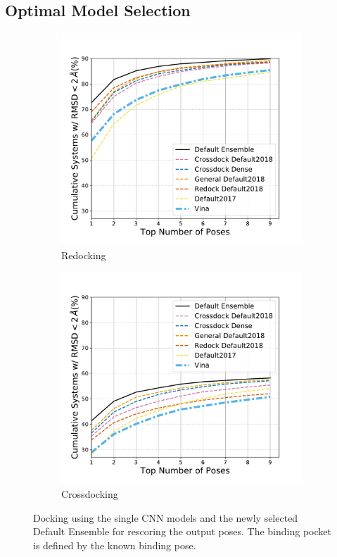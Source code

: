 \documentclass[journal=jcisd8,manuscript=article]{achemso}
\begin{document}
\subsection{Optimal Model Selection}
\begin{figure}
	\begin{subfigure}[b]{0.48\textwidth}
		\centering
		\includegraphics[width=\textwidth]{figures/redocking/rescore_single_models_line.pdf}
		\caption{Redocking}
		\label{fig:RescoreSingleRedock}
        \end{subfigure}    
	\begin{subfigure}[b]{0.48\textwidth}    
		\centering
		\includegraphics[width=\textwidth]{figures/crossdocking/rescore_single_models_line.pdf}
		\caption{Crossdocking}
		\label{fig:RescoreSingleCrossdock}
        \end{subfigure}    
	\caption{Docking using the single CNN models and the newly selected Default Ensemble for rescoring the output poses. The binding pocket is defined by the known binding pose.}
	\label{fig:RescoreSingle}
\end{figure}    
\end{document}
